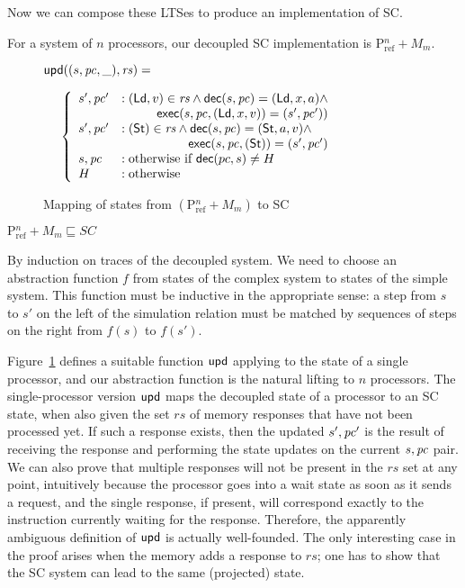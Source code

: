 Now we can compose these LTSes to produce an implementation of SC. 

For a system of $n$ processors, our decoupled SC implementation is
$\text{P$^n_{\text{ref}}$} + M_m$.

\begin{figure}[h]
\begin{boxedminipage}{\columnwidth}
\small
$\mathsf{upd}((s, \mathit{pc}, \_), \mathit{rs}) =$

\begin{math}
\;\;\;\;\;\left\{
\begin{array}{ll}
s', \pc' &: (\ld, v) \in \mathit{rs} \wedge \dec(s, \pc) = (\ld, x, a) \wedge\\
\multicolumn{2}{r}{\exec(s, \pc, (\ld, x, v)) = (s',\pc'))}\\
s', \pc' &: (\st) \in \mathit{rs} \wedge \dec(s, \pc) = (\st, a, v) \wedge\\
\multicolumn{2}{r}{\exec(s, \pc, (\st)) = (s',\pc')}\\
s, \pc &: \text{otherwise if } \dec(pc,s) \neq H\\
H &: \text{otherwise}
\end{array}
\right.
\end{math}
\end{boxedminipage}
\caption{Mapping of states from $(\text{P$^n_\text{ref}$} + M_m)$ to SC}
\label{smap}
\end{figure}

\begin{theorem}
$\text{P$^n_{\text{ref}}$} + M_m \sqsubseteq SC$\label{scthm}
\end{theorem}
\begin{prf}
By induction on traces of the decoupled system.  We need to choose an
abstraction function $f$ from states of the complex system to states of
the simple system.  This function must be inductive in the
appropriate sense: a step from $s$ to $s'$ on the left of the
simulation relation must be matched by sequences of steps on the right
from $f(s)$ to $f(s')$.

Figure~\ref{smap} defines a suitable function $\mathsf{upd}$ applying to the
state of a single processor, and our abstraction function is the
natural lifting to $n$ processors.
The single-processor version $\mathsf{upd}$ maps
the decoupled state of a processor to an SC state, when also given the
set $rs$ of memory responses that have not been processed yet. If such a
response exists, then the updated $s', \mathit{pc}'$ is the result of
receiving the response and performing the state updates on the current $s,
\mathit{pc}$ pair.  We can also prove that multiple responses will not be present in
the $rs$ set at any point, intuitively because the processor goes into a wait
state as soon as it sends a request, and the single response, if present, will
correspond exactly to the instruction currently waiting for the response.
Therefore, the apparently ambiguous definition of $\mathsf{upd}$ is actually
well-founded.  The only interesting case in the proof arises when the memory adds a
response to $rs$; one has to show that the SC system can lead to the same
(projected) state.
\end{prf}

